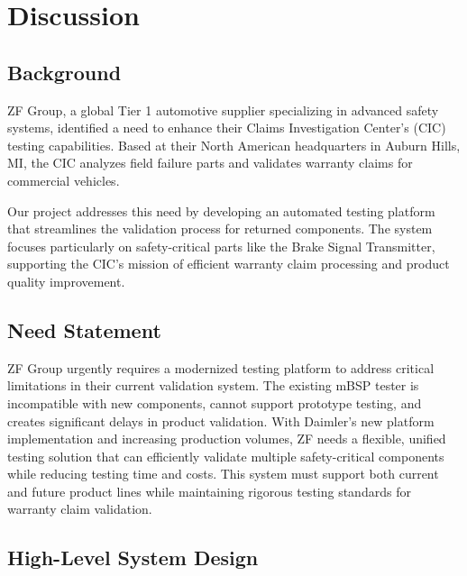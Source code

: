 \documentclass[12pt]{article}
\begin{document}
\section{Discussion}
\subsection{Background}

ZF Group, a global Tier 1 automotive supplier specializing in advanced safety 
systems, identified a need to enhance their Claims Investigation Center's (CIC) 
testing capabilities. Based at their North American headquarters in Auburn Hills, 
MI, the CIC analyzes field failure parts and validates warranty claims for 
commercial vehicles.

Our project addresses this need by developing an automated testing platform that 
streamlines the validation process for returned components. The system focuses 
particularly on safety-critical parts like the Brake Signal Transmitter, 
supporting the CIC's mission of efficient warranty claim processing and product 
quality improvement.


\subsection{Need Statement}
ZF Group urgently requires a modernized testing platform to address critical
limitations in their current validation system. The existing mBSP tester is
incompatible with new components, cannot support prototype testing, and creates
significant delays in product validation. With Daimler's new platform
implementation and increasing production volumes, ZF needs a flexible, unified
testing solution that can efficiently validate multiple safety-critical
components while reducing testing time and costs. This system must support both
current and future product lines while maintaining rigorous testing standards
for warranty claim validation.

\subsection{High-Level System Design}
\end{document}
